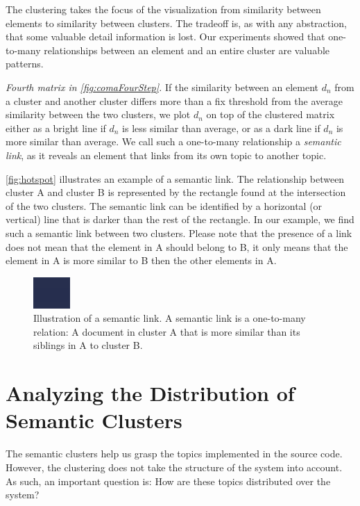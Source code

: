 The clustering takes the focus of the visualization from similarity between elements to similarity between clusters. The tradeoff is, as with any abstraction, that some valuable detail information is lost. Our experiments showed that one-to-many relationships between an element and an entire cluster are valuable patterns.

\emph{Fourth matrix in \autoref{fig:comaFourStep}.} If the similarity between an element $d_n$ from a cluster and another cluster differs more than a fix threshold from the average similarity between the two clusters, we plot $d_n$ on top of the clustered matrix either as a bright line if $d_n$ is less similar than average, or as a dark line if $d_n$ is more similar than average. We call such a one-to-many relationship a \emph{semantic link}, as it reveals an element that links from its own topic to another topic.

\autoref{fig:hotspot} illustrates an example of a semantic link. The relationship between cluster A and cluster B is represented by the rectangle found at the intersection of the two clusters. The semantic link can be identified by a horizontal (or vertical) line that is darker than the rest of the rectangle. In our example, we find such a semantic link between two clusters. Please note that the presence of a link does not mean that the element in A should belong to B, it only means that the element in A is more similar to B then the other elements in A.

\begin{figure}[h]
    \centering
  \includegraphics{hotspot}
  \caption{Illustration of a semantic link. A semantic link is a one-to-many relation: A document in cluster A that is more similar than its siblings in A to cluster B.}\label{fig:hotspot}
\end{figure}

\section{Analyzing the Distribution of Semantic Clusters}\label{sec:distribution}

The semantic clusters help us grasp the topics implemented in the source code. However, the clustering does not take the structure of the system into account. As such, an important question is: How are these topics distributed over the system?

